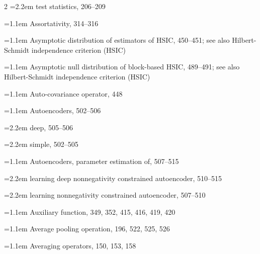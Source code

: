 \begin{multicols}{2}
\noindent\hangindent=2.2em \hspace*{1.1em}test statistics, 206--209\par
\noindent\hangindent=1.1em Assortativity, 314--316\par
\noindent\hangindent=1.1em Asymptotic distribution of estimators of HSIC, 450--451; see also Hilbert-Schmidt independence criterion (HSIC)\par
\noindent\hangindent=1.1em Asymptotic null distribution of block-based HSIC, 489--491; see also Hilbert-Schmidt independence criterion (HSIC)\par
\noindent\hangindent=1.1em Auto-covariance operator, 448\par
\noindent\hangindent=1.1em Autoencoders, 502--506\par
\noindent\hangindent=2.2em \hspace*{1.1em}deep, 505--506\par
\noindent\hangindent=2.2em \hspace*{1.1em}simple, 502--505\par
\noindent\hangindent=1.1em Autoencoders, parameter estimation of, 507--515\par
\noindent\hangindent=2.2em \hspace*{1.1em}learning deep nonnegativity constrained autoencoder, 510--515\par
\noindent\hangindent=2.2em \hspace*{1.1em}learning nonnegativity constrained autoencoder, 507--510\par
\noindent\hangindent=1.1em Auxiliary function, 349, 352, 415, 416, 419, 420\par
\noindent\hangindent=1.1em Average pooling operation, 196, 522, 525, 526\par
\noindent\hangindent=1.1em Averaging operators, 150, 153, 158\par


\end{multicols}
